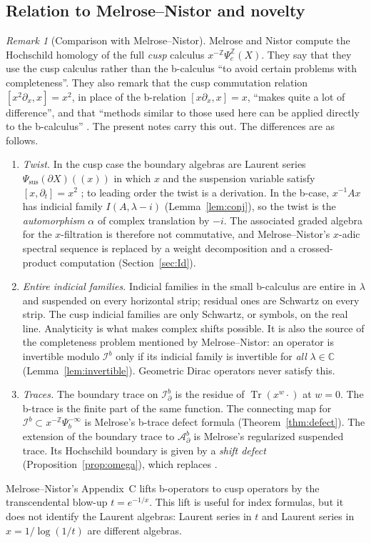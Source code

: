 \documentclass[11pt,oneside,reqno]{article}
\newcommand{\C}{\mathbb C}
\newcommand{\Z}{\mathbb Z}
\DeclareMathOperator{\Tr}{Tr}
\newcommand{\Ib}{\mathcal I^b}
\newcommand{\Idb}{\mathcal I^b_\partial}
\newcommand{\Adb}{\mathcal A^b_\partial}
\theoremstyle{plain}
\theoremstyle{definition}
\theoremstyle{remark}
\newtheorem{remark}[theorem]{Remark}
\newcommand{\Lser}[1]{(\!(#1)\!)}
\begin{document}
\subsection{Relation to Melrose--Nistor and novelty}\label{subsec:MN}
\begin{remark}[Comparison with Melrose--Nistor]\label{rem:MN}
Melrose and Nistor \cite{MN} compute the Hochschild homology of the full
\emph{cusp} calculus \(x^{-\Z}\Psi_c^{\Z}(X)\). They say that they use the cusp
calculus rather than the b-calculus ``to avoid certain problems with
completeness''. They also remark that the cusp commutation relation
\([x^2\partial_x,x]=x^2\), in place of the b-relation
\([x\partial_x,x]=x\), ``makes quite a lot of difference'', and that
``methods similar to those used here can be applied directly to the
b-calculus'' \cite[pp.~3--4]{MN}. The present notes carry this out. The
differences are as follows.
\begin{enumerate}
\item \emph{Twist.} In the cusp case the boundary algebras are Laurent
series \(\Psi_{\mathrm{sus}}(\partial X)\Lser{x}\) in which \(x\) and the
suspension variable satisfy \([x,\partial_t]=x^2\) \cite[(14)]{MN}; to
leading order the twist is a derivation. In the b-case,
\(x^{-1}Ax\) has indicial family \(I(A,\lambda-i)\)
(Lemma~\ref{lem:conj}), so the twist is the \emph{automorphism}
\(\alpha\) of complex translation by \(-i\). The associated graded
algebra for the \(x\)-filtration is therefore not commutative, and
Melrose--Nistor's \(x\)-adic spectral sequence \cite[proof of
Prop.~6]{MN} is replaced by a weight decomposition and a crossed-product
computation (Section~\ref{sec:Id}).
\item \emph{Entire indicial families.} Indicial families in the small
b-calculus are entire in \(\lambda\) and suspended on every horizontal
strip; residual ones are Schwartz on every strip. The cusp indicial
families are only Schwartz, or symbols, on the real line. Analyticity is
what makes complex shifts possible. It is also the source of the
completeness problem mentioned by Melrose--Nistor: an operator is
invertible modulo \(\Ib\) only if its indicial family is invertible for
\emph{all} \(\lambda\in\C\) (Lemma~\ref{lem:invertible}). Geometric Dirac
operators never satisfy this.
\item \emph{Traces.} The boundary trace on \(\Idb\) is the residue of
\(\Tr(x^w\cdot)\) at \(w=0\). The b-trace is the finite part of the same
function. The connecting map for \(\Ib\subset x^{-\Z}\Psi_b^{-\infty}\) is
Melrose's b-trace defect formula (Theorem~\ref{thm:defect}). The extension
of the boundary trace to \(\Adb\) is Melrose's regularized suspended trace.
Its Hochschild boundary is given by a \emph{shift defect}
(Proposition~\ref{prop:omega}), which replaces \cite[Lemma~13]{MN}.
\end{enumerate}
Melrose--Nistor's Appendix~C \cite[Prop.~26]{MN} lifts b-operators to cusp
operators by the transcendental blow-up \(t=e^{-1/x}\). This lift is useful
for index formulas, but it does not identify the Laurent algebras: Laurent
series in \(t\) and Laurent series in \(x=1/\log(1/t)\) are different
algebras.
\end{remark}
\end{document}
